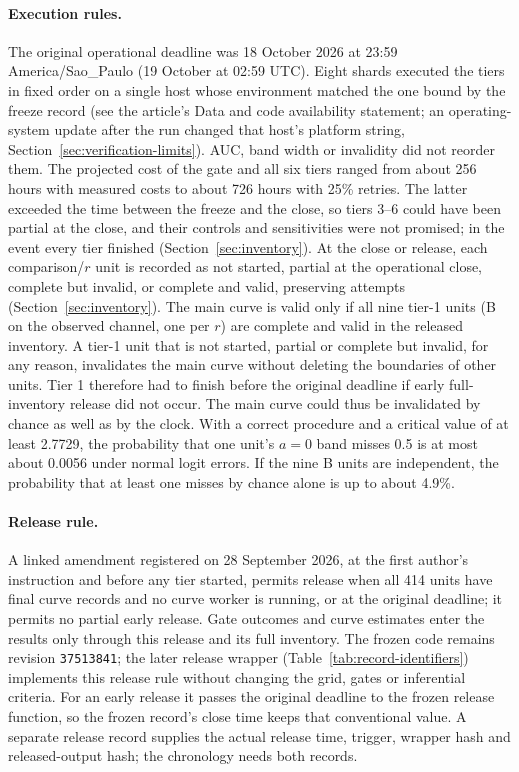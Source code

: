 \paragraph{Execution rules.}
The original operational deadline was 18 October 2026 at 23:59 America/Sao\_Paulo (19 October at 02:59 UTC). %
Eight shards executed the tiers in fixed order on a single host whose environment matched the one bound by the freeze record (see the article's Data and code availability statement; an operating-system update after the run changed that host's platform string, Section~\ref{sec:verification-limits}). AUC, band width or invalidity did not reorder them. %
The projected cost of the gate and all six tiers ranged from about 256 hours with measured costs to about 726 hours with 25\% retries. The latter exceeded the time between the freeze and the close, so tiers 3--6 could have been partial at the close, and their controls and sensitivities were not promised; in the event every tier finished (Section~\ref{sec:inventory}). %
At the close or release, each comparison/$r$ unit is recorded as not started, partial at the operational close, complete but invalid, or complete and valid, preserving attempts (Section~\ref{sec:inventory}). %
The main curve is valid only if all nine tier-1 units (B on the observed channel, one per $r$) are complete and valid in the released inventory. %
A tier-1 unit that is not started, partial or complete but invalid, for any reason, invalidates the main curve without deleting the boundaries of other units. Tier 1 therefore had to finish before the original deadline if early full-inventory release did not occur. %
The main curve could thus be invalidated by chance as well as by the clock. With a correct procedure and a critical value of at least 2.7729, the probability that one unit's $a=0$ band misses 0.5 is at most about 0.0056 under normal logit errors. If the nine B units are independent, the probability that at least one misses by chance alone is up to about 4.9\%. %

\paragraph{Release rule.}
A linked amendment registered on 28 September 2026, at the first author's instruction and before any tier started, permits release when all 414 units have final curve records and no curve worker is running, or at the original deadline; it permits no partial early release. Gate outcomes and curve estimates enter the results only through this release and its full inventory. %
The frozen code remains revision \texttt{37513841}; the later release wrapper (Table~\ref{tab:record-identifiers}) implements this release rule without changing the grid, gates or inferential criteria. %
For an early release it passes the original deadline to the frozen release function, so the frozen record's close time keeps that conventional value. %
A separate release record supplies the actual release time, trigger, wrapper hash and released-output hash; the chronology needs both records. %

